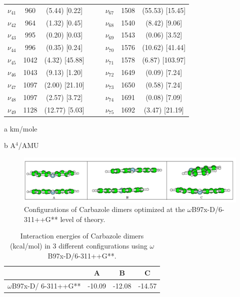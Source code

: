 \begin{table}[H]
\begin{center}
\begin{threeparttable}
\begin{tabular}{c c c c c c c c}
		$\nu_{41}$&	960&	(5.44)	[0.22] & & &	$\nu_{67}$&	1508&	(55.53)	[15.45]\\
		$\nu_{42}$&	964&	(1.32)	[0.45] & & &	$\nu_{68}$&	1540&	(8.42)	[9.06]\\
		$\nu_{43}$&	995&	(0.20)	[0.03] & & &	$\nu_{69}$&	1543&	(0.06)	[3.52]\\
		$\nu_{44}$&	996&	(0.35)	[0.24] & & &	$\nu_{70}$&	1576&	(10.62)	[41.44]\\
		$\nu_{45}$&	1042&	(4.32)	[45.88]	 & &&$\nu_{71}$&	1578&	(6.87)	[103.97]\\
		$\nu_{46}$&	1043&	(9.13)	[1.20] & & &	$\nu_{72}$&	1649&	(0.09)	[7.24]\\
		$\nu_{47}$&	1097&	(2.00)	[21.10] & & &	$\nu_{73}$&	1650&	(0.58)	[7.24]\\
		$\nu_{48}$&	1097&	(2.57)	[3.72] & & &	$\nu_{74}$&	1691&	(0.08)	[7.09]\\
		$\nu_{49}$&	1128&	(12.77)	[5.03] & & &	$\nu_{75}$&	1692&	(3.47)	[21.19]\\
				\bottomrule
				\end{tabular}
				
				\begin{tablenotes}
					\item[a] km/mole
					\item[b] A$^{4}$/AMU
				\end{tablenotes}
			\end{threeparttable}
		\end{center}
		\label{freq-IndoleDi}
	\end{table}
	
		\begin{figure}[H]
			\centering
			\includegraphics[scale=0.5]{image/Carbazole-dimer}
			\caption{Configurations of Carbazole dimers optimized at the $\omega$B97x-D/6-311++G** level of theory.}  \label{fig-carbazoleDi}
		\end{figure}
		
		
		\begin{table}[H]
			\caption{Interaction energies of Carbazole dimers (kcal/mol) in 3 different configurations using $\omega$B97x-D/6-311++G**.}
			\begin{center}
				\begin{tabular}{c c c c}
					\hline
					& \textbf{A} & \textbf{B} & \textbf{C} \\ \hline
					$\omega$B97x-D/
					6-311++G** & -10.09 & -12.08 & -14.57 \\ \hline
				\end{tabular}
			\end{center}
			\label{energie-carbazoleDi}
		\end{table}
		

